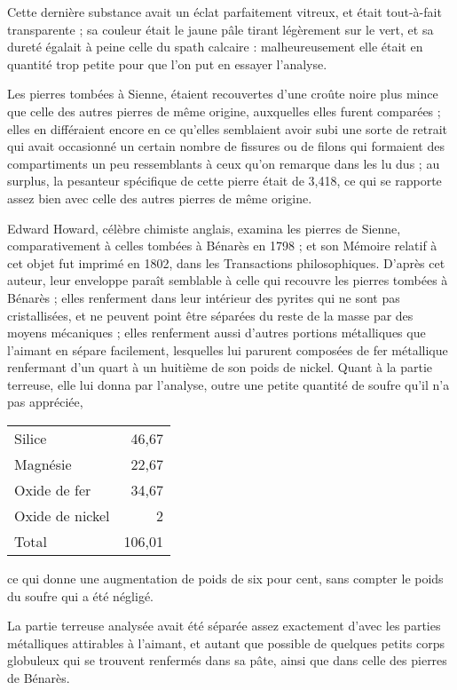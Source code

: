 \documentclass[a4paper, 12pt, oneside, french]{article}
\begin{document}
Cette dernière substance avait un éclat parfaitement vitreux, et était tout-à-fait transparente ; sa couleur était le jaune pâle tirant légèrement sur le vert, et sa dureté égalait à peine celle du spath calcaire : malheureusement elle était en quantité trop petite pour que l'on put en essayer l'analyse.

Les pierres tombées à Sienne, étaient recouvertes d'une croûte noire plus mince que celle des autres pierres de même origine, auxquelles elles furent comparées ; elles en différaient encore en ce qu'elles semblaient avoir subi une sorte de retrait qui avait occasionné un certain nombre de fissures ou de filons qui formaient des compartiments un peu ressemblants à ceux qu'on remarque dans les lu dus ; au surplus, la pesanteur spécifique de cette pierre était de 3,418, ce qui se rapporte assez bien avec celle des autres pierres de même origine.

Edward Howard, célèbre chimiste anglais, examina les pierres de Sienne, comparativement à celles tombées à Bénarès en 1798 ; et son Mémoire relatif à cet objet fut imprimé en 1802, dans les Transactions philosophiques. D'après cet auteur, leur enveloppe paraît semblable à celle qui recouvre les pierres tombées à Bénarès ; elles renferment dans leur intérieur des pyrites qui ne sont pas cristallisées, et ne peuvent point être séparées du reste de la masse par des moyens mécaniques ; elles renferment aussi d'autres portions métalliques que l'aimant en sépare facilement, lesquelles lui parurent composées de fer métallique renfermant d'un quart à un huitième de son poids de nickel. Quant à la partie terreuse, elle lui donna par l'analyse, outre une petite quantité de soufre qu'il n'a pas appréciée,
\begin{table}[H]
    \centering
    \Fontauri
    \large
    \begin{tabular}{l r}
        Silice & 46,67 \\
        Magnésie & 22,67 \\
        Oxide de fer & 34,67 \\
        Oxide de nickel & 2 \\ \hline
        Total & 106,01 \\
    \end{tabular}
\end{table}
ce qui donne une augmentation de poids de six pour cent, sans compter le poids du soufre qui a été négligé.

La partie terreuse analysée avait été séparée assez exactement d'avec les parties métalliques attirables à l'aimant, et autant que possible de quelques petits corps globuleux qui se trouvent renfermés dans sa pâte, ainsi que dans celle des pierres de Bénarès.
\end{document}
